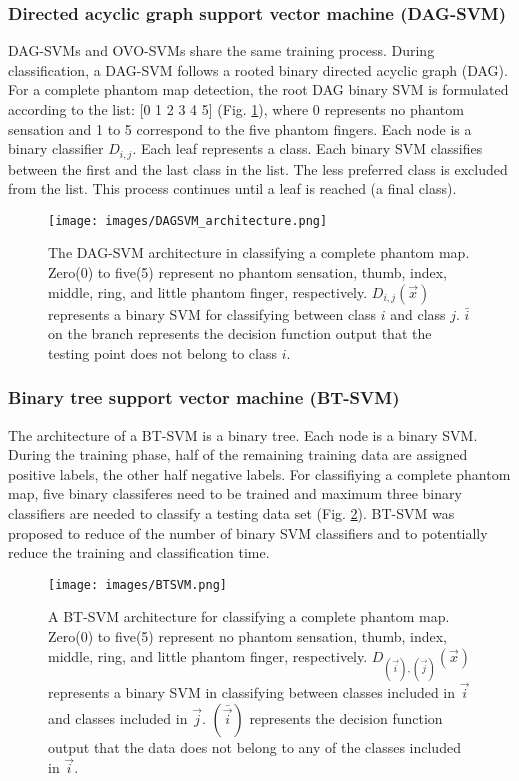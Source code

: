 \subsubsection{Directed acyclic graph support vector machine (DAG-SVM)}
DAG-SVMs and OVO-SVMs share the same training process. During classification, a DAG-SVM follows a rooted binary directed acyclic graph (DAG). For a complete phantom map detection, the root DAG binary SVM is formulated according to the list: [0 1 2 3 4 5] (Fig. \ref{Fig:DAGSVM_architecture}), where 0 represents no phantom sensation and 1 to 5 correspond to the five phantom fingers. Each node is a binary classifier $D_{i,j}$. Each leaf represents a class. Each binary SVM classifies between the first and the last class in the list. The less preferred class is excluded from the list. This process continues until a leaf is reached (a final class). 
\begin{figure}[htb]
    \centering
    \texttt{[image: images/DAGSVM\_architecture.png]}
    \caption{The DAG-SVM architecture in classifying a complete phantom map. Zero(0) to five(5) represent no phantom sensation, thumb, index, middle, ring, and little phantom finger, respectively.  $D_{i,j}(\vec{x})$ represents a binary SVM for classifying between class $i$ and class $j$. $\bar{i}$ on the branch represents the decision function output that the testing point does not belong to class $i$.}
    \label{Fig:DAGSVM_architecture}
\end{figure}

\subsubsection{Binary tree support vector machine (BT-SVM)}
The architecture of a BT-SVM is a binary tree. Each node is a binary SVM. During the training phase, half of the remaining training data are assigned positive labels, the other half negative labels. For classifiying a complete phantom map, five binary classiferes need to be trained and maximum three binary classifiers are needed to classify a testing data set (Fig.  \ref{Fig:BT_architecture}). BT-SVM was proposed to reduce of the number of binary SVM classifiers and to potentially reduce the training and classification time. 
\begin{figure}[htb]
    \centering
    \texttt{[image: images/BTSVM.png]}
    \caption{A BT-SVM architecture for classifying a complete phantom map. Zero(0) to five(5) represent no phantom sensation, thumb, index, middle, ring, and little phantom finger, respectively. $D_{(\vec{i}),(\vec{j})}(\vec{x})$ represents a binary SVM in classifying between classes included in $\vec{i}$ and classes included in $\vec{j}$. $(\bar{\vec{i}})$ represents the decision function output that the data does not belong to any of the classes included in $\vec{i}$.}
    \label{Fig:BT_architecture}
\end{figure}


